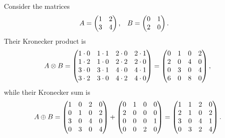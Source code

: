 \begin{example}
  Consider the matrices
  \begin{align}
    A &= \begin{pmatrix}
      1 & 2 \\
      3 & 4
    \end{pmatrix} \text,
    & B &= \begin{pmatrix}
      0 & 1 \\
      2 & 0
    \end{pmatrix} \text.
  \end{align}
  Their Kronecker product is
  \begin{equation}
    A \otimes B = \begin{pmatrix}
      1 \cdot 0 & 1 \cdot 1 & 2 \cdot 0 & 2 \cdot 1 \\
      1 \cdot 2 & 1 \cdot 0 & 2 \cdot 2 & 2 \cdot 0 \\
      3 \cdot 0 & 3 \cdot 1 & 4 \cdot 0 & 4 \cdot 1 \\
      3 \cdot 2 & 3 \cdot 0 & 4 \cdot 2 & 4 \cdot 0
    \end{pmatrix} = \begin{pmatrix}
      0 & 1 & 0 & 2 \\
      2 & 0 & 4 & 0 \\
      0 & 3 & 0 & 4 \\
      6 & 0 & 8 & 0
    \end{pmatrix}\text,
  \end{equation}
  while their Kronecker sum is
  \begin{equation}
    A \oplus B = \begin{pmatrix}
      1 & 0 & 2 & 0 \\
      0 & 1 & 0 & 2 \\
      3 & 0 & 4 & 0 \\
      0 & 3 & 0 & 4
    \end{pmatrix} + \begin{pmatrix}
      0 & 1 & 0 & 0 \\
      2 & 0 & 0 & 0 \\
      0 & 0 & 0 & 1 \\
      0 & 0 & 2 & 0
    \end{pmatrix} = \begin{pmatrix}
      1 & 1 & 2 & 0 \\
      2 & 1 & 0 & 2 \\
      3 & 0 & 4 & 1 \\
      0 & 3 & 2 & 4
    \end{pmatrix}\text.
  \end{equation}
\end{example}
